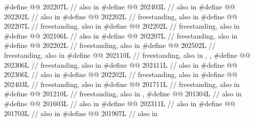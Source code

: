\begin{codeblock}
#define @@                       202207L // also in 
#define @@            202403L // also in 
#define @@                       202202L // also in 
#define @@                  202202L // freestanding, also in 
#define @@                     202207L // freestanding, also in 
#define @@                      202202L // freestanding, also in 
#define @@           202106L // also in 
#define @@                     202207L // freestanding, also in 
#define @@               202202L // freestanding, also in 
#define @@                   202502L // freestanding, also in 
#define @@                        202110L
  // freestanding, also in , , 
#define @@                             202306L // freestanding, also in 
#define @@             202411L // also in 
#define @@                               202306L // also in 
#define @@          202202L // freestanding, also in 
#define @@                 202403L // freestanding, also in 
#define @@                      201711L // freestanding, also in 
#define @@                  201210L
  // freestanding, also in , 
#define @@       201304L // also in 
#define @@                            201603L // also in 
#define @@             202311L // also in 
#define @@                       201703L // also in 
#define @@                         201907L // also in 

\end{codeblock}

